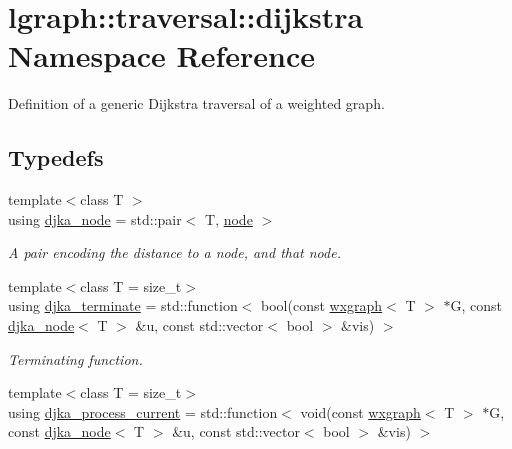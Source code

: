 \hypertarget{namespacelgraph_1_1traversal_1_1dijkstra}{}\section{lgraph\+:\+:traversal\+:\+:dijkstra Namespace Reference}
\label{namespacelgraph_1_1traversal_1_1dijkstra}


Definition of a generic Dijkstra traversal of a weighted graph.  


\subsection*{Typedefs}
\begin{DoxyCompactItemize}
\item 
\mbox{\label{namespacelgraph_1_1traversal_1_1dijkstra_ab54520d6f8049c8841128742624904a3}} 
{\footnotesize template$<$class T $>$ }\\using \hyperlink{namespacelgraph_1_1traversal_1_1dijkstra_ab54520d6f8049c8841128742624904a3}{djka\+\_\+node} = std\+::pair$<$ T, \hyperlink{namespacelgraph_a397169dd66adf725210a30fb7251773e}{node} $>$
\begin{DoxyCompactList}\small\item\em A pair encoding the distance to a node, and that node. \end{DoxyCompactList}\item 
{\footnotesize template$<$class T  = size\+\_\+t$>$ }\\using \hyperlink{namespacelgraph_1_1traversal_1_1dijkstra_afd9f50c2503c09300fff1bd48fad3aae}{djka\+\_\+terminate} = std\+::function$<$ bool(const \hyperlink{classlgraph_1_1wxgraph}{wxgraph}$<$ T $>$ $\ast$G, const \hyperlink{namespacelgraph_1_1traversal_1_1dijkstra_ab54520d6f8049c8841128742624904a3}{djka\+\_\+node}$<$ T $>$ \&u, const std\+::vector$<$ bool $>$ \&vis) $>$
\begin{DoxyCompactList}\small\item\em Terminating function. \end{DoxyCompactList}\item 
{\footnotesize template$<$class T  = size\+\_\+t$>$ }\\using \hyperlink{namespacelgraph_1_1traversal_1_1dijkstra_a6fd2792dd3d21438c17adc0187e99f66}{djka\+\_\+process\+\_\+current} = std\+::function$<$ void(const \hyperlink{classlgraph_1_1wxgraph}{wxgraph}$<$ T $>$ $\ast$G, const \hyperlink{namespacelgraph_1_1traversal_1_1dijkstra_ab54520d6f8049c8841128742624904a3}{djka\+\_\+node}$<$ T $>$ \&u, const std\+::vector$<$ bool $>$ \&vis) $>$

\end{DoxyCompactItemize}
